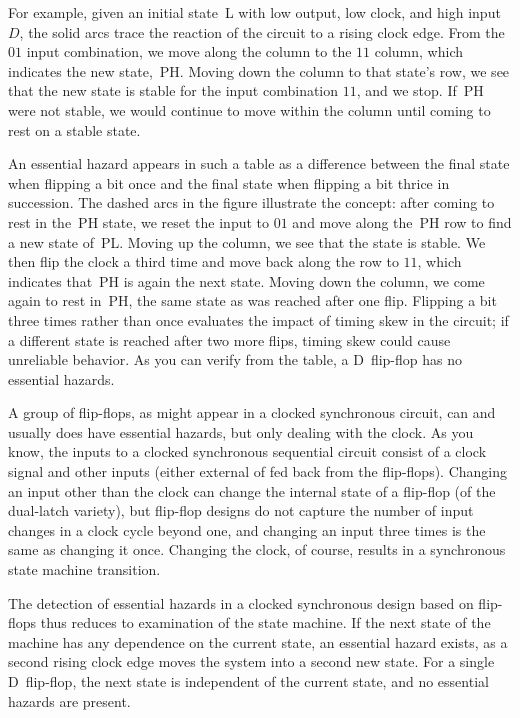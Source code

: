 For example, given an initial state~L with low output, low clock,
and high input~$D$, the solid arcs trace the reaction of the circuit to a
rising clock edge.  From the $01$ input combination, we move along the
column to the $11$ column, which indicates the new state,~PH.  Moving
down the column to that state's row, we see that the new state is
stable for the input combination $11$, and we stop.  If~PH were not
stable, we would continue to move within the column until coming to
rest on a stable state.

An essential hazard appears in such a table as a difference between
the final state when flipping a bit once and the final state when
flipping a bit thrice in succession.  The dashed arcs in the figure
illustrate the concept: after coming to rest in the~PH state, we reset
the input to $01$ and move along the~PH row to find a new state of~PL.
Moving up the column, we see that the state is stable.  We then flip
the clock a third time and move back along the row to $11$, which
indicates that~PH is again the next state.  Moving down the column, we
come again to rest in~PH, the same state as was reached after one
flip.  Flipping a bit three times rather than once evaluates the
impact of timing skew in the circuit; if a different state is reached
after two more flips, timing skew could cause unreliable behavior.  As
you can verify from the table, a D~flip-flop has no essential hazards.

A group of flip-flops, as might appear in a clocked synchronous
circuit, can and usually does have essential hazards, but only dealing
with the clock.  As you know, the inputs to a clocked synchronous
sequential circuit consist of a clock signal and other inputs (either
external of fed back from the flip-flops).  Changing an input other
than the clock can change the internal state of a flip-flop (of the
%
%
dual-latch variety), but flip-flop designs do not capture the number
of input changes in a clock cycle beyond one, and changing an input
three times is the same as changing it once.  Changing the clock, of
course, results in a synchronous state machine transition.

The detection of essential hazards in a clocked synchronous design
based on flip-flops thus reduces to examination of the state machine.
If the next state of the machine has any dependence on the current
state, an essential hazard exists, as a second rising clock edge moves
the system into a second new state.  For a single D~flip-flop, the
next state is independent of the current state, and no essential
hazards are present.

\vfill

\pagebreak


